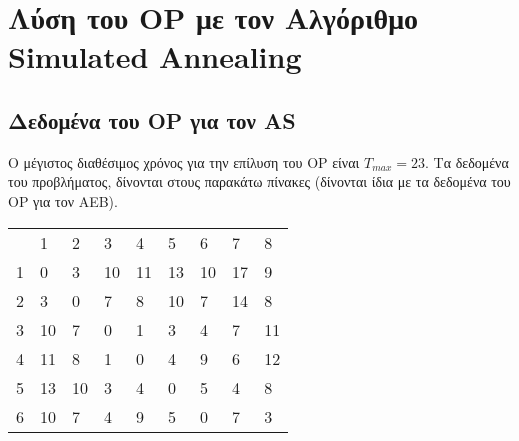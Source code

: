 \documentclass[12pt, a4paper]{article}
\begin{document}
\section{Λύση του OP με τον Αλγόριθμο Simulated Annealing}

\subsection{Δεδομένα του OP για τον AS}

Ο μέγιστος διαθέσιμος χρόνος για την επίλυση του OP είναι \(T_{max} = 23\). Τα δεδομένα του προβλήματος, δίνονται στους παρακάτω πίνακες (δίνονται ίδια με τα δεδομένα του OP για τον ΑΕΒ). 

\begin{table}[H]
\centering
\begin{tabular}{lllllllll}
                       & 1                       & 2                       & 3                       & 4                       & 5                       & 6                       & 7                       & 8                       \\ \cline{2-9} 
\multicolumn{1}{l|}{1} & \multicolumn{1}{l|}{0}  & \multicolumn{1}{l|}{3}  & \multicolumn{1}{l|}{10} & \multicolumn{1}{l|}{11} & \multicolumn{1}{l|}{13} & \multicolumn{1}{l|}{10} & \multicolumn{1}{l|}{17} & \multicolumn{1}{l|}{9}  \\ \cline{2-9} 
\multicolumn{1}{l|}{2} & \multicolumn{1}{l|}{3}  & \multicolumn{1}{l|}{0}  & \multicolumn{1}{l|}{7}  & \multicolumn{1}{l|}{8}  & \multicolumn{1}{l|}{10} & \multicolumn{1}{l|}{7}  & \multicolumn{1}{l|}{14} & \multicolumn{1}{l|}{8}  \\ \cline{2-9} 
\multicolumn{1}{l|}{3} & \multicolumn{1}{l|}{10} & \multicolumn{1}{l|}{7}  & \multicolumn{1}{l|}{0}  & \multicolumn{1}{l|}{1}  & \multicolumn{1}{l|}{3}  & \multicolumn{1}{l|}{4}  & \multicolumn{1}{l|}{7}  & \multicolumn{1}{l|}{11} \\ \cline{2-9} 
\multicolumn{1}{l|}{4} & \multicolumn{1}{l|}{11} & \multicolumn{1}{l|}{8}  & \multicolumn{1}{l|}{1}  & \multicolumn{1}{l|}{0}  & \multicolumn{1}{l|}{4}  & \multicolumn{1}{l|}{9}  & \multicolumn{1}{l|}{6}  & \multicolumn{1}{l|}{12} \\ \cline{2-9} 
\multicolumn{1}{l|}{5} & \multicolumn{1}{l|}{13} & \multicolumn{1}{l|}{10} & \multicolumn{1}{l|}{3}  & \multicolumn{1}{l|}{4}  & \multicolumn{1}{l|}{0}  & \multicolumn{1}{l|}{5}  & \multicolumn{1}{l|}{4}  & \multicolumn{1}{l|}{8}  \\ \cline{2-9} 
\multicolumn{1}{l|}{6} & \multicolumn{1}{l|}{10} & \multicolumn{1}{l|}{7}  & \multicolumn{1}{l|}{4}  & \multicolumn{1}{l|}{9}  & \multicolumn{1}{l|}{5}  & \multicolumn{1}{l|}{0}  & \multicolumn{1}{l|}{7}  & \multicolumn{1}{l|}{3}  \\ \cline{2-9} 

\end{tabular}
\end{table}
\end{document}
